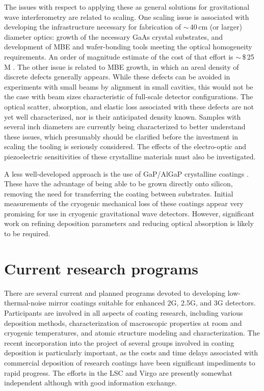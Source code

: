 The issues with respect to applying these as general solutions for gravitational wave interferometry are related to scaling. One scaling issue is associated with developing the infrastructure necessary for fabrication of $\mathrm{\sim}$\,40\,cm (or larger) diameter optics: growth of the necessary GaAs crystal substrates, and development of MBE and wafer-bonding tools meeting the optical homogeneity requirements. An order of magnitude estimate of the cost of that effort is $\mathrm{\sim}$\,\$\,25\,M \cite{Cole2018AlGaAsCost}. The other issue is related to MBE growth, in which an areal density of discrete defects generally appears. While these defects can be avoided in experiments with small beams by alignment in small cavities, this would not be the case with beam sizes characteristic of full-scale detector configurations. The optical scatter, absorption, and elastic loss associated with these defects are not yet well characterized, nor is their anticipated density known. Samples with several inch diameters are currently being characterized to better understand these issues, which presumably should be clarified before the investment in scaling the tooling is seriously considered. The effects of the electro-optic and piezoelectric sensitivities of these crystalline materials must also be investigated. 

A less well-developed approach is the use of GaP/AlGaP crystalline coatings \cite{lin2015epitaxial}. These have the advantage of being able to be grown directly onto silicon, removing the need for transferring the coating between substrates. Initial measurements of the cryogenic mechanical loss of these coatings appear very promising for use in cryogenic gravitational wave detectors. However, significant work on refining deposition parameters and reducing optical absorption is likely to be required.

\section{Current research programs}

There are several current and planned programs devoted to developing low-thermal-noise mirror coatings suitable for enhanced 2G, 2.5G, and 3G detectors. Participants are involved in all aspects of coating research, including various deposition methods, characterization of macroscopic properties at room and cryogenic temperatures, and atomic structure modeling and characterization. The recent incorporation into the project of several groups involved in coating deposition is particularly important, as the costs and time delays associated with commercial deposition of research coatings have been significant impediments to rapid progress. The efforts in the LSC and Virgo are presently somewhat independent although with good information exchange. 

